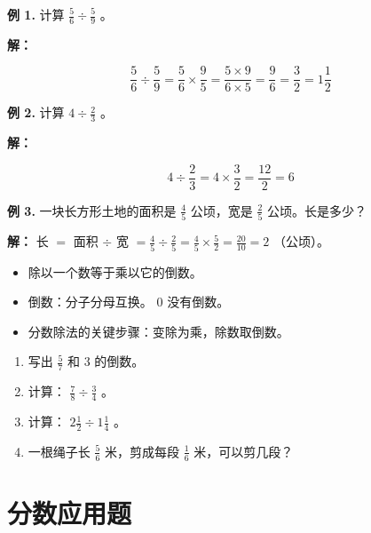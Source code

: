 \begin{workedexamples}


\textbf{例 1.} 计算 $\frac{5}{6} \div \frac{5}{9}$ 。

\textbf{解：}

\[
\frac{5}{6} \div \frac{5}{9} = \frac{5}{6} \times \frac{9}{5} = \frac{5 \times 9}{6 \times 5} = \frac{9}{6} = \frac{3}{2} = 1\frac{1}{2}
\]


\textbf{例 2.} 计算 $4 \div \frac{2}{3}$ 。

\textbf{解：}

\[
4 \div \frac{2}{3} = 4 \times \frac{3}{2} = \frac{12}{2} = 6
\]


\textbf{例 3.} 一块长方形土地的面积是 $\frac{4}{5}$ 公顷，宽是 $\frac{2}{5}$ 公顷。长是多少？

\textbf{解：} 长 $=$ 面积 $\div$ 宽 $= \frac{4}{5} \div \frac{2}{5} = \frac{4}{5} \times \frac{5}{2} = \frac{20}{10} = 2$ （公顷）。

\end{workedexamples}

\begin{keytakeaway}


\begin{itemize}
  \item 除以一个数等于乘以它的倒数。
  \item 倒数：分子分母互换。 $0$ 没有倒数。
  \item 分数除法的关键步骤：变除为乘，除数取倒数。
\end{itemize}


\end{keytakeaway}

\begin{practice}


\begin{enumerate}
  \item 写出 $\frac{5}{7}$ 和 $3$ 的倒数。
  \item 计算： $\frac{7}{8} \div \frac{3}{4}$ 。
  \item 计算： $2\frac{1}{2} \div 1\frac{1}{4}$ 。
  \item 一根绳子长 $\frac{5}{6}$ 米，剪成每段 $\frac{1}{6}$ 米，可以剪几段？
\end{enumerate}


\end{practice}

\section*{分数应用题}


